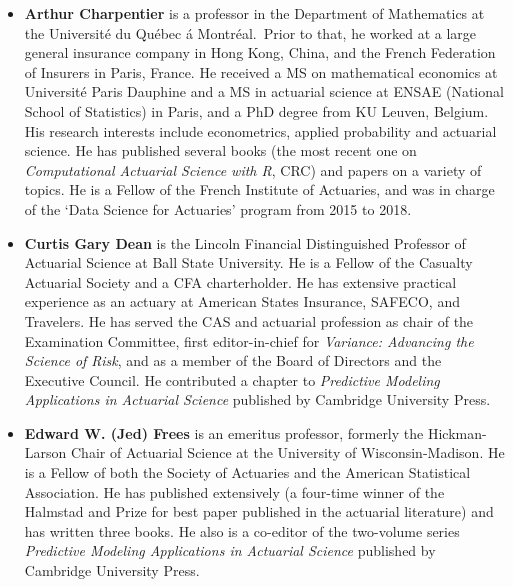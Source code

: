 \documentclass[
]{book}
\providecommand{\tightlist}{%
  \setlength{\itemsep}{0pt}\setlength{\parskip}{0pt}}
\begin{document}
\begin{itemize}
\tightlist
\item
  \textbf{Arthur Charpentier} is a professor in the Department of Mathematics at the Université du Québec á Montréal.~Prior to that, he worked at a large general insurance company in Hong Kong, China, and the French Federation of Insurers in Paris, France. He received a MS on mathematical economics at Université Paris Dauphine and a MS in actuarial science at ENSAE (National School of Statistics) in Paris, and a PhD degree from KU Leuven, Belgium. His research interests include econometrics, applied probability and actuarial science. He has published several books (the most recent one on \emph{Computational Actuarial Science with R}, CRC) and papers on a variety of topics. He is a Fellow of the French Institute of Actuaries, and was in charge of the `Data Science for Actuaries' program from 2015 to 2018.
\end{itemize}

\begin{itemize}
\tightlist
\item
  \textbf{Curtis Gary Dean} is the Lincoln Financial Distinguished Professor of Actuarial Science at Ball State University. He is a Fellow of the Casualty Actuarial Society and a CFA charterholder. He has extensive practical experience as an actuary at American States Insurance, SAFECO, and Travelers. He has served the CAS and actuarial profession as chair of the Examination Committee, first editor-in-chief for \emph{Variance: Advancing the Science of Risk}, and as a member of the Board of Directors and the Executive Council. He contributed a chapter to \emph{Predictive Modeling Applications in Actuarial Science} published by Cambridge University Press.
\end{itemize}

\begin{itemize}
\tightlist
\item
  \textbf{Edward W. (Jed) Frees} is an emeritus professor, formerly the Hickman-Larson Chair of Actuarial Science at the University of Wisconsin-Madison. He is a Fellow of both the Society of Actuaries and the American Statistical Association. He has published extensively (a four-time winner of the Halmstad and Prize for best paper published in the actuarial literature) and has written three books. He also is a co-editor of the two-volume series \emph{Predictive Modeling Applications in Actuarial Science} published by Cambridge University Press.
\end{itemize}
\end{document}
